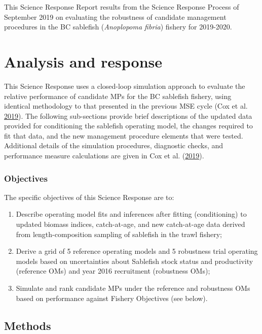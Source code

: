 \documentclass[11pt]{book}
\begin{document}
This Science Response Report results from the Science Response Process of September 2019 on evaluating the robustness of candidate management procedures in the BC sablefish (\emph{Anoplopoma fibria}) fishery for 2019-2020.

\hypertarget{analysis-and-response}{%
\section{Analysis and response}\label{analysis-and-response}}

This Science Response uses a closed-loop simulation approach to evaluate the relative performance of candidate MPs for the BC sablefish fishery, using identical methodology to that presented in the previous MSE cycle (Cox et al. \protect\hyperlink{ref-cox2019evaluating}{2019}). The following sub-sections provide brief descriptions of the updated data provided for conditioning the sablefish operating model, the changes required to fit that data, and the new management procedure elements that were tested. Additional details of the simulation procedures, diagnostic checks, and performance measure calculations are given in Cox et al. (\protect\hyperlink{ref-cox2019evaluating}{2019}).

\hypertarget{objectives}{%
\subsubsection{Objectives}\label{objectives}}

The specific objectives of this Science Response are to:
\begin{enumerate}
\def\labelenumi{\arabic{enumi}.}

\item
  Describe operating model fits and inferences after fitting (conditioning) to updated biomass indices, catch-at-age, and new catch-at-age data derived from length-composition sampling of sablefish in the trawl fishery;
\item
  Derive a grid of 5 reference operating models and 5 robustness trial operating models based on uncertainties about Sablefish stock status and productivity (reference OMs) and year 2016 recruitment (robustness OMs);
\item
  Simulate and rank candidate MPs under the reference and robustness OMs based on performance against Fishery Objectives (see below).
\end{enumerate}
\hypertarget{methods}{%
\subsection{Methods}\label{methods}}
\end{document}
